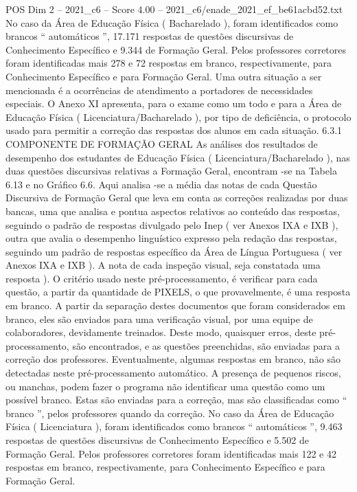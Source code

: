 \begin{textsample}{POS Dim 2 – 2021\_c6 – Score 4.00 – 2021\_c6/enade\_2021\_ef\_be61acbd52.txt}
No caso da Área de Educação Física ( Bacharelado ), foram identificados como brancos “ automáticos ”, 17.171 respostas de questões discursivas de Conhecimento Específico e 9.344 de Formação Geral.
Pelos professores corretores foram identificadas mais 278 e 72 respostas em branco, respectivamente, para Conhecimento Específico e para Formação Geral.
Uma outra situação a ser mencionada é a ocorrências de atendimento a portadores de necessidades especiais.
O Anexo XI apresenta, para o exame como um todo e para a Área de Educação Física ( Licenciatura/Bacharelado ), por tipo de deficiência, o protocolo usado para permitir a correção das respostas dos alunos em cada situação. 6.3.1 COMPONENTE DE FORMAÇÃO GERAL As análises dos resultados de desempenho dos estudantes de Educação Física ( Licenciatura/Bacharelado ), nas duas questões discursivas relativas a Formação Geral, encontram -se na Tabela 6.13 e no Gráfico 6.6.
Aqui analisa -se a média das notas de cada Questão Discursiva de Formação Geral que leva em conta as correções realizadas por duas bancas, uma que analisa e pontua aspectos relativos ao conteúdo das respostas, seguindo o padrão de respostas divulgado pelo Inep ( ver Anexos IXA e IXB ), outra que avalia o desempenho linguístico expresso pela redação das respostas, seguindo um padrão de respostas específico da Área de Língua Portuguesa ( ver Anexos IXA e IXB ).
A nota de cada inspeção visual, seja constatada uma resposta ).
O critério usado neste pré-processamento, é verificar para cada questão, a partir da quantidade de PIXELS, o que provavelmente, é uma resposta em branco.
A partir da separação destes documentos que foram considerados em branco, eles são enviados para uma verificação visual, por uma equipe de colaboradores, devidamente treinados.
Deste modo, quaisquer erros, deste pré-processamento, são encontrados, e as questões preenchidas, são enviadas para a correção dos professores.
Eventualmente, algumas respostas em branco, não são detectadas neste pré-processamento automático.
A presença de pequenos riscos, ou manchas, podem fazer o programa não identificar uma questão como um possível branco.
Estas são enviadas para a correção, mas são classificadas como “ branco ”, pelos professores quando da correção.
No caso da Área de Educação Física ( Licenciatura ), foram identificados como brancos “ automáticos ”, 9.463 respostas de questões discursivas de Conhecimento Específico e 5.502 de Formação Geral.
Pelos professores corretores foram identificadas mais 122 e 42 respostas em branco, respectivamente, para Conhecimento Específico e para Formação Geral.

\end{textsample}

